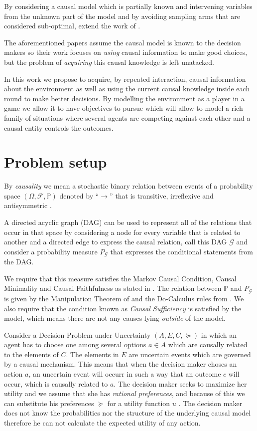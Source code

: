 \documentclass{article}
\begin{document}
By considering a causal model which is partially known and intervening variables from the unknown part of the model and by avoiding sampling arms that are considered sub-optimal, \cite{sen2017identifying} extend the work of \cite{lattimoreNIPS2016}.

The aforementioned papers assume the causal model is known to the decision makers so their work focuses on \textit{using} causal information to make good choices, but the problem of \textit{acquiring} this causal knowledge is left unatacked.

In this work we propose to acquire, by repeated interaction, causal information about the environment as well as using the current causal knowledge inside each round to make better decisions. By modelling the environment as a player in a game we allow it to have objectives to pursue which will allow to model a rich family of situations where several agents are competing against each other and a causal entity controls the outcomes. 

\section{Problem setup}{\label{problem_setup}}
By \textit{causality} we mean a stochastic binary relation between events of a probability space $(\Omega, \mathcal{F}, \mathbb{P})$ denoted by $“\to”$ that is transitive, irreflexive and antisymmetric \cite{spirtes2000causation}. 

A directed acyclic graph (DAG) can be used to represent all of the relations that occur in that space by considering a node for every variable that is related to another and a directed edge to express the causal relation, call this DAG $\mathcal{G}$ and consider a probability measure $P_{\mathcal{G}}$ that expresses the conditional statements from the DAG. 

We require that this measure satisfies the Markov Causal Condition, Causal Minimality and Causal Faithfulness as stated in \cite{spirtes2000causation}. The relation between $\mathbb{P}$ and $P_{\mathcal{G}}$ is given by the Manipulation Theorem of \cite{spirtes2000causation} and the Do-Calculus rules from \cite{pearl2009causality}. We also require that the condition known as \textit{Causal Sufficiency} is satisfied by the model, which means there are not any causes lying \textit{outside} of the model. 

Consider a Decision Problem under Uncertainty $(A,E,C,\succeq)$ in which an agent has to choose one among several options $a \in A$ which are causally related to the elements of $C$. The elements in $E$ are uncertain events which are governed by a causal mechanism. This means that when the decision maker choses an action $a$, an uncertain event will occurr in such a way that an outcome $c$ will occur, which is causally related to $a$. The decision maker seeks to maximize her utility and we assume that she has \textit{rational preferences}, and because of this we can substitute his preferences $\succeq$ for a utility function $u$ \cite{gilboa2009decision}. The decision maker does not know the probabilities nor the structure of the underlying causal model therefore he can not calculate the expected utility of any action. 
\end{document}
